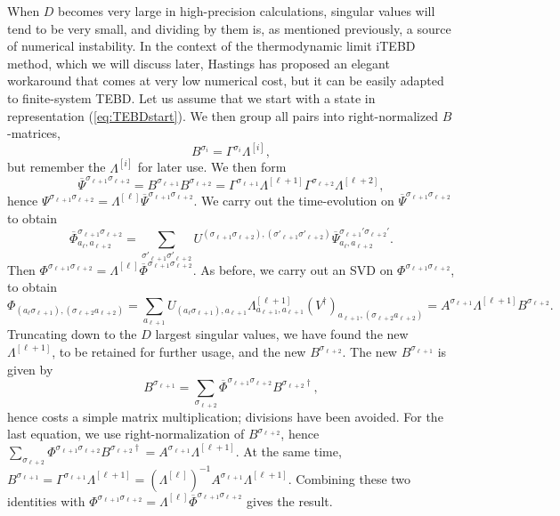 \documentclass[a4paper,10pt,oneside,onecolumn,1p,times]{elsarticle}
\begin{document}
When $D$ becomes very large in high-precision calculations, singular values will tend to be very small, and dividing by them is, as mentioned previously, a source of numerical instability. In the context of the thermodynamic limit iTEBD method, which we will discuss later, Hastings has proposed an elegant workaround that comes at very low numerical cost\cite{Hastings09}, but it can be easily adapted to finite-system TEBD. Let us assume that we start with a state in representation (\ref{eq:TEBDstart}). We then group all pairs into right-normalized $B$-matrices,
\begin{equation}
B^{\sigma_i} = \Gamma^{\sigma_i} \Lambda^{[i]} ,
\end{equation}
but remember the $\Lambda^{[i]}$ for later use. We then form
\begin{equation}
\overline{\Psi}^{\sigma_{\ell+1} \sigma_{\ell+2}} = B^{\sigma_{\ell+1}} B^{\sigma_{\ell+2}} =  \Gamma^{\sigma_{\ell+1}} \Lambda^{[\ell+1]}
\Gamma^{\sigma_{\ell+2}} \Lambda^{[\ell+2]} ,
\end{equation}
hence $\Psi^{\sigma_{\ell+1} \sigma_{\ell+2}} = \Lambda^{[\ell]} \overline{\Psi}^{\sigma_{\ell+1} \sigma_{\ell+2}}$. We carry out the time-evolution on $\overline{\Psi}^{\sigma_{\ell+1} \sigma_{\ell+2}}$ to obtain
\begin{equation}
\overline{\Phi}^{\sigma_{\ell+1}\sigma_{\ell+2}}_{a_\ell, a_{\ell+2}} = \sum_{\sigma'_{\ell+1} \sigma'_{\ell+2}}
U^{(\sigma_{\ell+1} \sigma_{\ell+2}), (\sigma'_{\ell+1} \sigma'_{\ell+2})}  \overline{\Psi}^{\sigma_{\ell+1}'\sigma_{\ell+2}'}_{a_\ell, a_{\ell+2}} .
\end{equation} 
Then $\Phi^{\sigma_{\ell+1} \sigma_{\ell+2}} = \Lambda^{[\ell]} \overline{\Phi}^{\sigma_{\ell+1} \sigma_{\ell+2}}$. As before, we carry out an SVD on $\Phi^{\sigma_{\ell+1} \sigma_{\ell+2}}$, to obtain 
\begin{equation}
\Phi_{(a_\ell \sigma_{\ell+1}), (\sigma_{\ell+2} a_{\ell+2})} = \sum_{a_{\ell+1}} U_{(a_\ell \sigma_{\ell+1}),a_{\ell+1}} \Lambda^{[\ell+1]}_{a_{\ell+1},a_{\ell+1}} (V^\dagger)_{a_{\ell+1}, (\sigma_{\ell+2} a_{\ell+2})} = A^{\sigma_{\ell+1}} \Lambda^{[\ell+1]} B^{\sigma_{\ell+2}} .
\end{equation}
Truncating down to the $D$ largest singular values, we have found the new $\Lambda^{[\ell+1]}$, to be retained for further usage, and the new $B^{\sigma_{\ell+2}}$. The new $B^{\sigma_{\ell+1}}$
is given by 
\begin{equation}
B^{\sigma_{\ell+1}} = \sum_{\sigma_{\ell+2}}  \overline{\Phi}^{\sigma_{\ell+1}\sigma_{\ell+2}}
B^{\sigma_{\ell+2}\dagger},
\end{equation}
hence costs a simple matrix multiplication; divisions have been avoided. For the last equation, we use right-normalization of $B^{\sigma_{\ell+2}}$, hence $\sum_{\sigma_{\ell+2}} \Phi^{\sigma_{\ell+1}\sigma_{\ell+2}} B^{\sigma_{\ell+2}\dagger} =  A^{\sigma_{\ell+1}} \Lambda^{[\ell+1]}$. At the same time, $B^{\sigma_{\ell+1}} = \Gamma^{\sigma_{\ell+1}} \Lambda^{[\ell+1]} = (\Lambda^{[\ell]})^{-1} A^{\sigma_{\ell+1}}  \Lambda^{[\ell+1]}$. Combining these two identities with $\Phi^{\sigma_{\ell+1} \sigma_{\ell+2}} = \Lambda^{[\ell]} \overline{\Phi}^{\sigma_{\ell+1} \sigma_{\ell+2}}$ gives the result.
\end{document}

